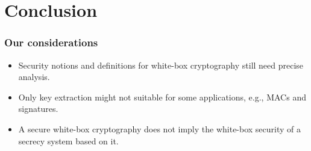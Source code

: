 \documentclass{beamer}
\begin{document}
\section{Conclusion}







\frame
{
\frametitle{Our considerations}

\begin{itemize}
\setlength{\itemsep}{12pt}
\item Security notions and definitions for white-box cryptography still need precise analysis.

\item Only key extraction might not suitable for some applications, e.g., MACs and signatures.

\item A secure white-box cryptography does not imply the white-box security of a secrecy system based on it.
\end{itemize}

}
\end{document}
